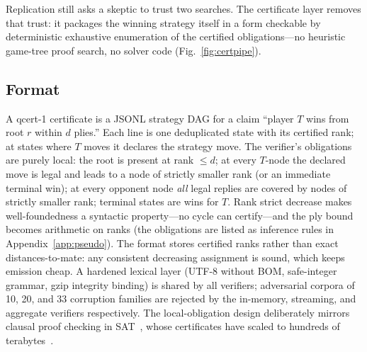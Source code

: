\documentclass[conference]{IEEEtran}
\begin{document}
Replication still asks a skeptic to trust two searches. The certificate layer removes that trust: it packages the winning strategy itself in a form checkable by deterministic exhaustive enumeration of the certified obligations---no heuristic game-tree proof search, no solver code (Fig.~\ref{fig:certpipe}).

\subsection{Format}

A \textsf{qcert-1} certificate is a JSONL strategy DAG for a claim ``player $T$ wins from root $r$ within $d$ plies.'' Each line is one deduplicated state with its certified rank; at states where $T$ moves it declares the strategy move. The verifier's obligations are purely local: the root is present at rank $\leq d$; at every $T$-node the declared move is legal and leads to a node of strictly smaller rank (or an immediate terminal win); at every opponent node \emph{all} legal replies are covered by nodes of strictly smaller rank; terminal states are wins for $T$. Rank strict decrease makes well-foundedness a syntactic property---no cycle can certify---and the ply bound becomes arithmetic on ranks (the obligations are listed as inference rules in Appendix~\ref{app:pseudo}). The format stores certified ranks rather than exact distances-to-mate: any consistent decreasing assignment is sound, which keeps emission cheap. A hardened lexical layer (UTF-8 without BOM, safe-integer grammar, gzip integrity binding) is shared by all verifiers; adversarial corpora of 10, 20, and 33 corruption families are rejected by the in-memory, streaming, and aggregate verifiers respectively. The local-obligation design deliberately mirrors clausal proof checking in SAT~\cite{wetzler2014drattrim}, whose certificates have scaled to hundreds of terabytes~\cite{heule2016solving}.
\end{document}

